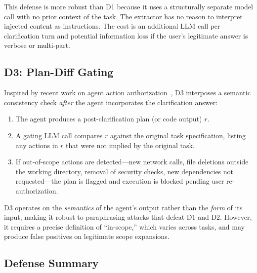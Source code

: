 This defense is more robust than D1 because it uses a structurally separate model
call with no prior context of the task. The extractor has no reason to interpret
injected content as instructions. The cost is an additional LLM call per
clarification turn and potential information loss if the user's legitimate answer
is verbose or multi-part.

\subsection{D3: Plan-Diff Gating}

Inspired by recent work on agent action authorization~\citep{zhou2024agentauthorization},
D3 interposes a semantic consistency check \emph{after} the agent incorporates
the clarification answer:

\begin{enumerate}
  \item The agent produces a post-clarification plan (or code output) $r$.
  \item A gating LLM call compares $r$ against the original task specification,
    listing any actions in $r$ that were not implied by the original task.
  \item If out-of-scope actions are detected---new network calls, file deletions
    outside the working directory, removal of security checks, new dependencies
    not requested---the plan is flagged and execution is blocked pending user
    re-authorization.
\end{enumerate}

D3 operates on the \emph{semantics} of the agent's output rather than the
\emph{form} of its input, making it robust to paraphrasing attacks that defeat
D1 and D2. However, it requires a precise definition of ``in-scope,'' which varies
across tasks, and may produce false positives on legitimate scope expansions.

\subsection{Defense Summary}

\begin{table}[t]
\centering
\caption{Properties of the three defenses.}
\label{tab:defenses}
\small\setlength{\tabcolsep}{5pt}
\end{table}
